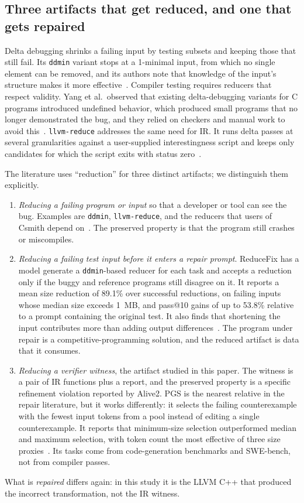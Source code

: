 \documentclass[conference]{IEEEtran}
\begin{document}
\subsection{Three artifacts that get reduced, and one that gets repaired}

Delta debugging shrinks a failing input by testing subsets and keeping those that still fail. Its \texttt{ddmin} variant stops at a 1-minimal input, from which no single element can be removed, and its authors note that knowledge of the input's structure makes it more effective~\cite{zeller2002dd}. Compiler testing requires reducers that respect validity. Yang et al.\ observed that existing delta-debugging variants for C programs introduced undefined behavior, which produced small programs that no longer demonstrated the bug, and they relied on checkers and manual work to avoid this~\cite{yang2011csmith}. \texttt{llvm-reduce} addresses the same need for IR. It runs delta passes at several granularities against a user-supplied interestingness script and keeps only candidates for which the script exits with status zero~\cite{llvmreducedoc}.

The literature uses ``reduction'' for three distinct artifacts; we distinguish them explicitly.
\begin{enumerate}
\item \emph{Reducing a failing program or input} so that a developer or tool can see the bug. Examples are \texttt{ddmin}, \texttt{llvm-reduce}, and the reducers that users of Csmith depend on~\cite{zeller2002dd,yang2011csmith,llvmreducedoc}. The preserved property is that the program still crashes or miscompiles.
\item \emph{Reducing a failing test input before it enters a repair prompt}. ReduceFix has a model generate a \texttt{ddmin}-based reducer for each task and accepts a reduction only if the buggy and reference programs still disagree on it. It reports a mean size reduction of 89.1\% over successful reductions, on failing inputs whose median size exceeds 1~MB, and pass@10 gains of up to 53.8\% relative to a prompt containing the original test. It also finds that shortening the input contributes more than adding output differences~\cite{yang2026reducefix}. The program under repair is a competitive-programming solution, and the reduced artifact is data that it consumes.
\item \emph{Reducing a verifier witness}, the artifact studied in this paper. The witness is a pair of IR functions plus a report, and the preserved property is a specific refinement violation reported by Alive2. PGS is the nearest relative in the repair literature, but it works differently: it selects the failing counterexample with the fewest input tokens from a pool instead of editing a single counterexample. It reports that minimum-size selection outperformed median and maximum selection, with token count the most effective of three size proxies~\cite{he2026pgs}. Its tasks come from code-generation benchmarks and SWE-bench, not from compiler passes.
\end{enumerate}
What is \emph{repaired} differs again: in this study it is the LLVM C++ that produced the incorrect transformation, not the IR witness.
\end{document}
